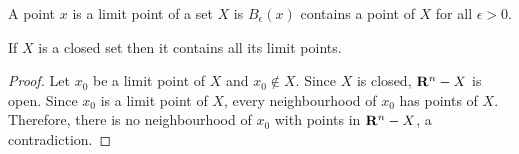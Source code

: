 \begin{defn}\label{c1s2d1}
A point $x$ is a limit point of a set $X$ is $B_\epsilon(x)$ contains a point
of $X$ for all $\epsilon > 0$.
\end{defn}

\begin{lem}\label{c1s2l5}
If $X$ is a closed set then it contains all its limit points.
\end{lem}
\begin{proof}
Let $x_0$ be a limit point of $X$ and $x_0 \notin X$. Since $X$ is closed,
$\mathbf{R}^n - X$ is open. Since $x_0$ is a limit point of $X$, every neighbourhood
of $x_0$ has points of $X$. Therefore, there is no neighbourhood of $x_0$ with
points in $\mathbf{R}^n - X$, a contradiction.
\end{proof}

